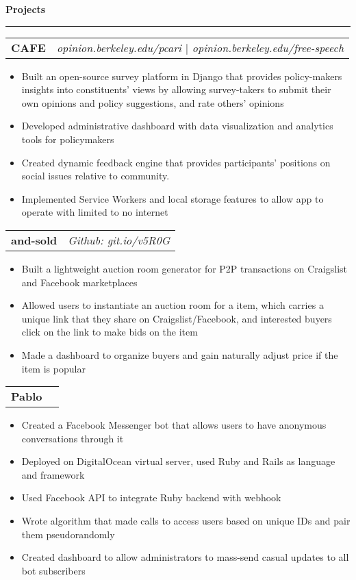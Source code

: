 \documentclass[11pt,letterpaper]{article}
\makeatletter
\newenvironment{topic}[1]
    {
    {\Large \centerline{#1}}
    \vspace*{0.03in}
    \hrule 
    \vspace*{0.05in}
    }
    {}
\newenvironment{event}
    {
    \begin{tabular*}{\textwidth}{l@{\extracolsep{\fill}}r}
    }
    {
    \end{tabular*}
    }
\makeatother
\begin{document}
    \begin{topic}{\textbf{Projects}}
        \begin{event}
            \textbf{CAFE} & \emph{opinion.berkeley.edu/pcari $\vert$ opinion.berkeley.edu/free-speech}
        \end{event}
            \begin{itemize}
                \item Built an open-source survey platform in Django that provides policy-makers insights into constituents' views by allowing survey-takers to submit their own opinions and policy suggestions, and rate others' opinions
                \item Developed administrative dashboard with data visualization and analytics tools for policymakers
                \item Created dynamic feedback engine that provides participants' positions on social issues relative to community.
                \item Implemented Service Workers and local storage features to allow app to operate with limited to no internet
            \end{itemize}

        \begin{event}
        \textbf{and-sold} & \emph{Github: git.io/v5R0G}
        \end{event}
            \begin{itemize}
                \item Built a lightweight auction room generator for P2P transactions on Craigslist and Facebook marketplaces
                \item Allowed users to instantiate an auction room for a item, which carries a unique link that they share on Craigslist/Facebook, and interested buyers click on the link to make bids on the item 
                \item Made a dashboard to organize buyers and gain naturally adjust price if the item is popular
            \end{itemize}

        \begin{event}
        \textbf{Pablo}
        \end{event}
            \begin{itemize}
                \item Created a Facebook Messenger bot that allows users to have anonymous conversations through it
                \item Deployed on DigitalOcean virtual server, used Ruby and Rails as language and framework
                \item Used Facebook API to integrate Ruby backend with webhook 
                \item Wrote algorithm that made calls to access users based on unique IDs and pair them pseudorandomly
                \item Created dashboard to allow administrators to mass-send casual updates to all bot subscribers
            \end{itemize}


\end{topic}
\end{document}
